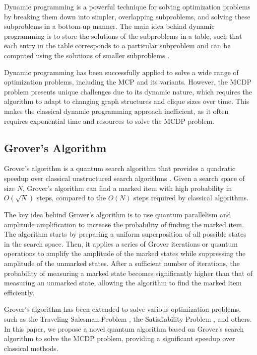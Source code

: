 Dynamic programming is a powerful technique for solving optimization problems by breaking them down into simpler, overlapping subproblems, and solving these subproblems in a bottom-up manner. The main idea behind dynamic programming is to store the solutions of the subproblems in a table, such that each entry in the table corresponds to a particular subproblem and can be computed using the solutions of smaller subproblems \cite{cormen}.

Dynamic programming has been successfully applied to solve a wide range of optimization problems, including the MCP and its variants. However, the MCDP problem presents unique challenges due to its dynamic nature, which requires the algorithm to adapt to changing graph structures and clique sizes over time. This makes the classical dynamic programming approach inefficient, as it often requires exponential time and resources to solve the MCDP problem.

\subsection{Grover's Algorithm}

Grover's algorithm is a quantum search algorithm that provides a quadratic speedup over classical unstructured search algorithms \cite{grover}. Given a search space of size $N$, Grover's algorithm can find a marked item with high probability in $O(\sqrt{N})$ steps, compared to the $O(N)$ steps required by classical algorithms.

The key idea behind Grover's algorithm is to use quantum parallelism and amplitude amplification to increase the probability of finding the marked item. The algorithm starts by preparing a uniform superposition of all possible states in the search space. Then, it applies a series of Grover iterations or quantum operations to amplify the amplitude of the marked states while suppressing the amplitude of the unmarked states. After a sufficient number of iterations, the probability of measuring a marked state becomes significantly higher than that of measuring an unmarked state, allowing the algorithm to find the marked item efficiently.

Grover's algorithm has been extended to solve various optimization problems, such as the Traveling Salesman Problem \cite{travelling_salesman}, the Satisfiability Problem \cite{satisfiability}, and others. In this paper, we propose a novel quantum algorithm based on Grover's search algorithm to solve the MCDP problem, providing a significant speedup over classical methods.

